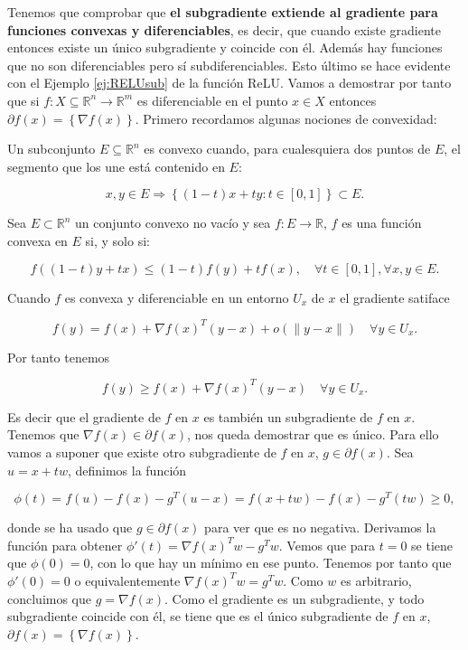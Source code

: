 Tenemos que comprobar que \textbf{el subgradiente extiende al gradiente para funciones convexas y diferenciables}, es decir, que cuando existe gradiente entonces existe un único subgradiente y coincide con él. Además hay funciones que no son diferenciables pero sí subdiferenciables. Esto último se hace evidente con el Ejemplo \ref{ej:RELUsub} de la función ReLU. Vamos a demostrar por tanto que si $f: X \subseteq \mathbb{R}^n \rightarrow \mathbb{R}^m$ es diferenciable en el punto $x\in X$ entonces  $\partial f(x)= \left \{ \nabla f(x) \right \}$. Primero recordamos algunas nociones de convexidad:


\begin{definicion}
    Un subconjunto $E \subseteq \mathbb{R}^n$ es convexo cuando, para cualesquiera dos puntos de $E$, el segmento que los une está contenido en $E$:

    $$x,y \in E \Rightarrow \left \{ (1-t)x + ty : t\in [0,1] \right \} \subset E.$$
\end{definicion}




\begin{definicion}
    Sea $E \subset \mathbb{R}^n$ un conjunto convexo no vacío y sea $f:E \rightarrow \mathbb{R}$, $f$ es una función convexa en $E$ si, y solo si:

    $$f( (1-t)y + tx) \leq (1-t) f(y) + tf(x), \quad \forall t \in [0,1], \forall x,y \in E.$$
\end{definicion}

Cuando $f$ es convexa y diferenciable en un entorno $U_x$ de $x$ el gradiente satiface 

$$  f(y) = f(x) + \nabla f(x)^T(y-x) + o(\|y-x \|) \quad \forall y \in U_x .$$

Por tanto tenemos

$$ f(y) \geq f(x) + \nabla f(x)^T(y-x) \quad \forall y \in U_x.$$

Es decir que el gradiente de $f$ en $x$ es también un subgradiente de $f$ en $x$. Tenemos que $\nabla f(x) \in \partial f(x)$, nos queda demostrar que es único. Para ello vamos a suponer que existe otro subgradiente de $f$ en $x$, $g \in \partial f(x)$. Sea $u=x+tw$, definimos la función

$$\phi(t)=f(u)-f(x)- g^T(u-x) = f(x+tw) -f(x) - g^T(tw) \geq 0,$$

donde se ha usado que $g \in \partial f(x)$ para ver que es no negativa. Derivamos la función para obtener $\phi'(t) = \nabla f(x)^Tw - g^Tw$. Vemos que para $t=0$ se tiene que $\phi(0)=0$, con lo que hay un mínimo en ese punto. Tenemos por tanto que $\phi'(0)=0$ o equivalentemente $\nabla f(x)^Tw=g^Tw$. Como $w$ es arbitrario, concluimos que $g=\nabla f(x)$. Como el gradiente es un subgradiente, y todo subgradiente coincide con él, se tiene que es el único subgradiente de $f$ en $x$, $\partial f(x) = \left \{ \nabla f(x) \right \}$. 



